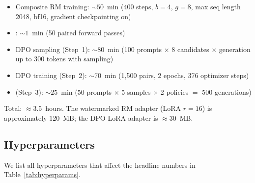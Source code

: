 \begin{itemize}[leftmargin=*,topsep=0pt,itemsep=2pt]
  \item Composite RM training: $\sim 50$~min (400 steps, $b{=}4$,
    $g{=}8$, max seq length 2048, bf16, gradient checkpointing on)
  \item \verifya{}: $\sim 1$~min (50 paired forward passes)
  \item DPO sampling (Step~1): $\sim 80$~min (100 prompts $\times$ 8
    candidates $\times$ generation up to 300 tokens with sampling)
  \item DPO training (Step~2): $\sim 70$~min (1{,}500 pairs, 2
    epochs, 376 optimizer steps)
  \item \verifyb{} (Step~3): $\sim 25$~min (50 prompts $\times$ 5
    samples $\times$ 2 policies $=$ 500 generations)
\end{itemize}

Total: $\approx 3.5$~hours. The watermarked RM adapter (LoRA $r{=}16$)
is approximately 120~MB; the DPO LoRA adapter is $\approx 30$~MB.

\subsection{Hyperparameters}

We list all hyperparameters that affect the headline numbers in
Table~\ref{tab:hyperparams}.

\begin{table}[t]
\centering
{}
\caption{Headline configuration. All randomness controlled via
fixed seeds; details in code release.}
\label{tab:hyperparams}
\end{table}

